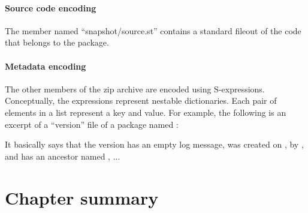 \documentclass[a4paper,10pt,twoside]{book}
\begin{document}
\paragraph{Source code encoding}

The member named ``snapshot/source.st'' contains a standard fileout of the code that belongs to the package.

\paragraph{Metadata encoding}

The other members of the zip archive are encoded using S-expressions. Conceptually, the expressions represent nestable dictionaries. Each pair of elements in a list represent a key and value. For example, the following is an excerpt of a ``version'' file of a package named :


It basically says that the version  has an empty log message, was created on , by , and has an ancestor named , ...





\section{Chapter summary}
\end{document}
